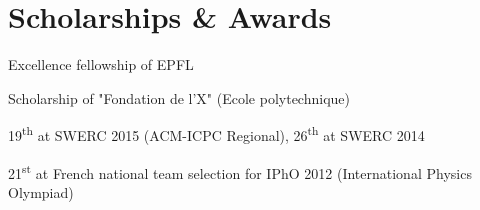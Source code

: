 \documentclass[a4paper,10pt]{article} %
\begin{document}

\section{Scholarships \& Awards}

\begin{dinglist}{67} \itemsep -4pt
    \item Excellence fellowship of EPFL
    \item Scholarship of "Fondation de l’X" (Ecole polytechnique)
    \item 19\textsuperscript{th} at SWERC 2015 (ACM-ICPC Regional), 26\textsuperscript{th} at SWERC 2014
    \item 21\textsuperscript{st} at French national team selection for IPhO 2012 (International Physics Olympiad)
\end{dinglist}






\end{document}
